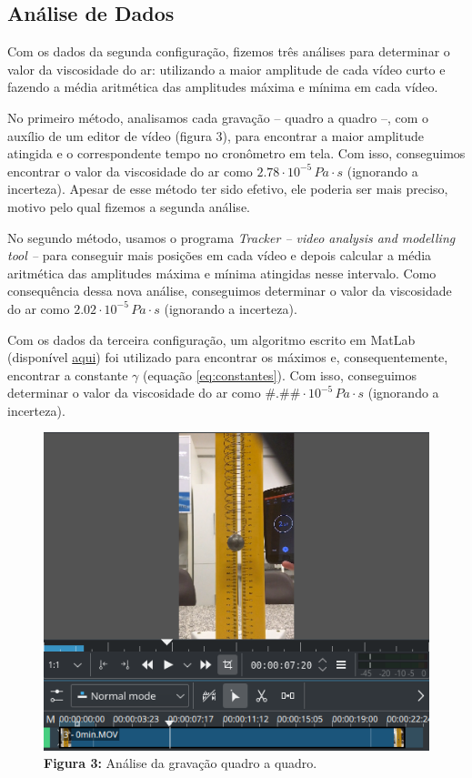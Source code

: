 \documentclass[a4paper, 12pt]{article}
\begin{document}
\begin{multicols}{2}
		\section{Análise de Dados}
		\label{sec:analise}
			\par Com os dados da segunda configuração, fizemos três análises para determinar o valor da viscosidade do ar: utilizando a maior amplitude de cada vídeo curto e fazendo a média aritmética das amplitudes máxima e mínima em cada vídeo.
			\par No primeiro método, analisamos cada gravação -- quadro a quadro --, com o auxílio de um editor de vídeo (figura 3), para encontrar a maior amplitude atingida e o correspondente tempo no cronômetro em tela. Com isso, conseguimos encontrar o valor da viscosidade do ar como $2.78 \cdot 10^{-5} \, Pa \cdot s$ (ignorando a incerteza). Apesar de esse método ter sido efetivo, ele poderia ser mais preciso, motivo pelo qual fizemos a segunda análise.
			\par No segundo método, usamos o programa \textit{Tracker -- video analysis and modelling tool --} para conseguir mais posições em cada vídeo e depois calcular a média aritmética das amplitudes máxima e mínima atingidas nesse intervalo. Como consequência dessa nova análise, conseguimos determinar o valor da viscosidade do ar como $2.02 \cdot 10^{-5} \, Pa \cdot s$ (ignorando a incerteza).
			\par Com os dados da terceira configuração, um algoritmo escrito em MatLab (disponível \href{https://github.com/hugoalkimim/ViscosidadeDoAr/tree/master/Algoritmo}{aqui}) foi utilizado para encontrar os máximos e, consequentemente, encontrar a constante $\gamma$ (equação \hyperref[eq:constantes]{\ref{eq:constantes}}). Com isso, conseguimos determinar o valor da viscosidade do ar como $\#.\#\# \cdot 10^{-5} \, Pa \cdot s$ (ignorando a incerteza).
			\begin{figure}[H]
				\centering
				\includegraphics[scale=0.4]{./img/quadros.png}
				\captionsetup{labelformat=empty}
				\caption{\textbf{Figura 3:} Análise da gravação quadro a quadro.}
			\end{figure}
			

\end{multicols}
\end{document}
